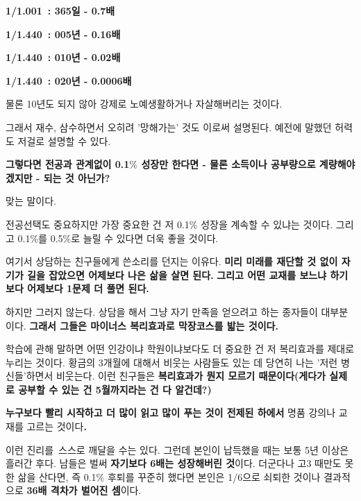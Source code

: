\textbf{1/1.001 : 365일 - 0.7배}
\vspace{5mm}

\textbf{1/1.440 : 005년 - 0.16배}
\vspace{5mm}

\textbf{1/1.440 : 010년 - 0.02배}
\vspace{5mm}

\textbf{1/1.440 : 020년 - 0.0006배}
\vspace{5mm}

물론 10년도 되지 않아 강제로 노예생활하거나 자살해버리는 것이다.
\vspace{5mm}

그래서 재수, 삼수하면서 오히려 '망해가는' 것도 이로써 설명된다.
예전에 말했던 허력도 저걸로 설명할 수 있다.
\vspace{5mm}

\textbf{그렇다면 전공과 관계없이 0.1$\%$ 성장만 한다면 - 물론 소득이나 공부량으로 계량해야겠지만 - 되는 것 아닌가?}
\vspace{5mm}

맞는 말이다.
\vspace{5mm}

전공선택도 중요하지만 가장 중요한 건 저 0.1$\%$ 성장을 계속할 수 있냐는 것이다.
그리고 0.1$\%$를 0.5$\%$로 늘릴 수 있다면 더욱 좋을 것이다.
\vspace{5mm}

여기서 상담하는 친구들에게 쓴소리를 던지는 이유다.
\textbf{미리 미래를 재단할 것 없이 자기가 길을 잡았으면 어제보다 나은 삶을 살면 된다.}
\textbf{그리고 어떤 교재를 보느냐 하기보다 어제보다 1문제 더 풀면 된다.}
\vspace{5mm}

하지만 그러지 않는다. 상담을 해서 그냥 자기 만족을 얻으려고 하는 종자들이 대부분이다.
\textbf{그래서 그들은 마이너스 복리효과로 막장코스를 밟는 것이다.}
\vspace{5mm}

학습에 관해 말하면 어떤 인강이냐 학원이냐보다도 더 중요한 건 저 복리효과를 제대로 누리는 것이다.
황금의 3개월에 대해서 비웃는 사람들도 있는 데 당연히 나는 '저런 병신들'하면서 비웃는다.
이런 친구들은 \textbf{복리효과가 뭔지 모르기 때문이다(게다가 실제로 공부할 수 있는 건 5월까지라는 건 다 알건데?)}
\vspace{5mm}

\textbf{누구보다 빨리 시작하고 더 많이 읽고 많이 푸는 것이 전제된 하에서} 명품 강의나 교재를 고르는 것이다\textbf{.}
\vspace{5mm}

이런 진리를 스스로 깨달을 수는 있다. 그런데 본인이 납득했을 때는 보통 5년 이상은 흘러간 후다.
남들은 벌써 \textbf{자기보다 6배는 성장해버린 것}이다.
더군다나 고3 때만도 못 한 삶을 산다면, 즉 0.1$\%$ 후퇴를 꾸준히 했다면 본인은 1/6으로 쇠퇴한 것이나
결과적으로 \textbf{36배 격차가 벌어진 셈}이다.
\vspace{5mm}

